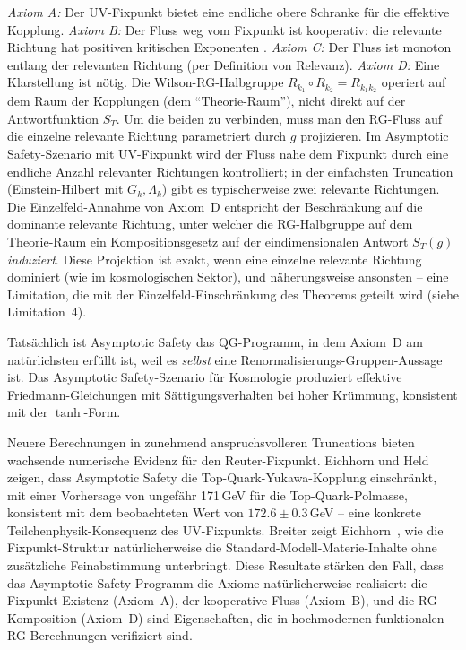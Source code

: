 \documentclass[aps,prd,twocolumn,superscriptaddress,nofootinbib]{revtex4-2}
\begin{document}
\textit{Axiom A:} Der UV-Fixpunkt bietet eine endliche obere Schranke für die effektive Kopplung. \textit{Axiom B:} Der Fluss weg vom Fixpunkt ist kooperativ: die relevante Richtung hat positiven kritischen Exponenten \cite{Percacci2017}. \textit{Axiom C:} Der Fluss ist monoton entlang der relevanten Richtung (per Definition von Relevanz). \textit{Axiom D:} Eine Klarstellung ist nötig. Die Wilson-RG-Halbgruppe $R_{k_1} \circ R_{k_2} = R_{k_1 k_2}$ operiert auf dem Raum der Kopplungen (dem ``Theorie-Raum''), nicht direkt auf der Antwortfunktion $S_T$. Um die beiden zu verbinden, muss man den RG-Fluss auf die einzelne relevante Richtung parametriert durch $g$ projizieren. Im Asymptotic Safety-Szenario mit UV-Fixpunkt wird der Fluss nahe dem Fixpunkt durch eine endliche Anzahl relevanter Richtungen kontrolliert; in der einfachsten Truncation (Einstein-Hilbert mit $G_k, \Lambda_k$) gibt es typischerweise zwei relevante Richtungen. Die Einzelfeld-Annahme von Axiom~D entspricht der Beschränkung auf die dominante relevante Richtung, unter welcher die RG-Halbgruppe auf dem Theorie-Raum ein Kompositionsgesetz auf der eindimensionalen Antwort $S_T(g)$ \textit{induziert}. Diese Projektion ist exakt, wenn eine einzelne relevante Richtung dominiert (wie im kosmologischen Sektor), und näherungsweise ansonsten -- eine Limitation, die mit der Einzelfeld-Einschränkung des Theorems geteilt wird (siehe Limitation~4).

Tatsächlich ist Asymptotic Safety das QG-Programm, in dem Axiom~D am natürlichsten erfüllt ist, weil es \textit{selbst} eine Renormalisierungs-Gruppen-Aussage ist. Das Asymptotic Safety-Szenario für Kosmologie \cite{Bonanno2002} produziert effektive Friedmann-Gleichungen mit Sättigungsverhalten bei hoher Krümmung, konsistent mit der $\tanh$-Form.

Neuere Berechnungen in zunehmend anspruchsvolleren Truncations bieten wachsende numerische Evidenz für den Reuter-Fixpunkt. Eichhorn und Held~\cite{EichhornHeld2018} zeigen, dass Asymptotic Safety die Top-Quark-Yukawa-Kopplung einschränkt, mit einer Vorhersage von ungefähr 171\,GeV für die Top-Quark-Polmasse, konsistent mit dem beobachteten Wert von $172.6 \pm 0.3$\,GeV \cite{PDG2024} -- eine konkrete Teilchenphysik-Konsequenz des UV-Fixpunkts. Breiter zeigt Eichhorn~\cite{Eichhorn2020}, wie die Fixpunkt-Struktur natürlicherweise die Standard-Modell-Materie-Inhalte ohne zusätzliche Feinabstimmung unterbringt. Diese Resultate stärken den Fall, dass das Asymptotic Safety-Programm die Axiome natürlicherweise realisiert: die Fixpunkt-Existenz (Axiom~A), der kooperative Fluss (Axiom~B), und die RG-Komposition (Axiom~D) sind Eigenschaften, die in hochmodernen funktionalen RG-Berechnungen verifiziert sind.
\end{document}
